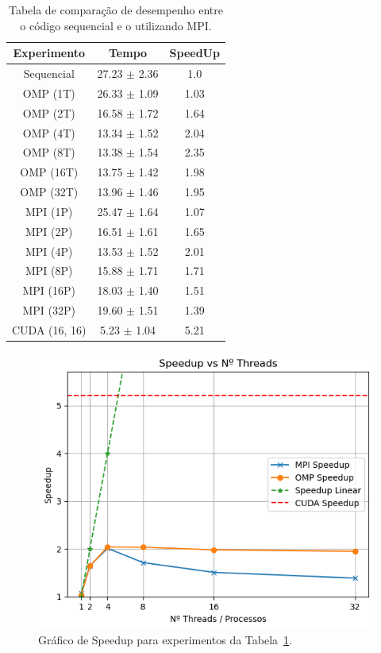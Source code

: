 \documentclass[12pt]{article}
\begin{document}
\begin{table}[ht]
  \centering
  \caption{Tabela de comparação de desempenho entre o código sequencial e o
    utilizando MPI.}\label{tab:Resultados}
  \vspace{0.3cm}
  \begin{tabular}{||c c c||}
    \hline
    Experimento   & Tempo            & SpeedUp \\ [0.5ex]
    \hline\hline
    Sequencial    & 27.23 $\pm$ 2.36 & 1.0     \\
    \hline
    OMP (1T)      & 26.33 $\pm$ 1.09 & 1.03    \\
    \hline
    OMP (2T)      & 16.58 $\pm$ 1.72 & 1.64    \\
    \hline
    OMP (4T)      & 13.34 $\pm$ 1.52 & 2.04    \\
    \hline
    OMP (8T)      & 13.38 $\pm$ 1.54 & 2.35    \\
    \hline
    OMP (16T)     & 13.75 $\pm$ 1.42 & 1.98    \\
    \hline
    OMP (32T)     & 13.96 $\pm$ 1.46 & 1.95    \\
    \hline
    MPI (1P)      & 25.47 $\pm$ 1.64 & 1.07    \\
    \hline
    MPI (2P)      & 16.51 $\pm$ 1.61 & 1.65    \\
    \hline
    MPI (4P)      & 13.53 $\pm$ 1.52 & 2.01    \\
    \hline
    MPI (8P)      & 15.88 $\pm$ 1.71 & 1.71    \\
    \hline
    MPI (16P)     & 18.03 $\pm$ 1.40 & 1.51    \\
    \hline
    MPI (32P)     & 19.60 $\pm$ 1.51 & 1.39    \\
    \hline
    CUDA (16, 16) & 5.23 $\pm$ 1.04  & 5.21    \\
    \hline
  \end{tabular}
\end{table}

\begin{figure}[ht]
  \centering
  \includegraphics[width=.45\textwidth]{figs/speedupxthreads.png}
  \caption{Gráfico de Speedup para experimentos da Tabela~\ref{tab:Resultados}.}\label{fig:speedupxthread}
\end{figure}
\end{document}
